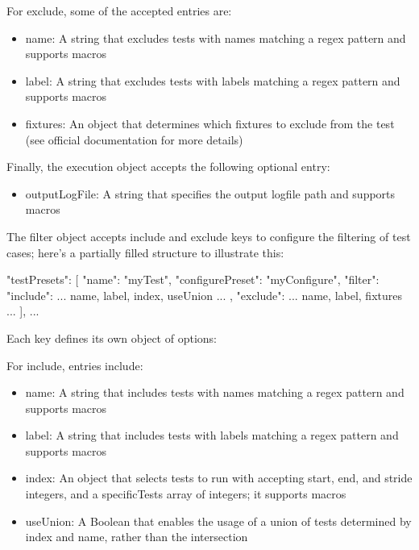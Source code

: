 For exclude, some of the accepted entries are:

\begin{itemize}
\item
name: A string that excludes tests with names matching a regex pattern and supports macros

\item
label: A string that excludes tests with labels matching a regex pattern and supports macros

\item
fixtures: An object that determines which fixtures to exclude from the test (see official documentation for more details)
\end{itemize}

Finally, the execution object accepts the following optional entry:

\begin{itemize}
\item
outputLogFile: A string that specifies the output logfile path and supports macros
\end{itemize}

The filter object accepts include and exclude keys to configure the filtering of test cases; here’s a partially filled structure to illustrate this:

\begin{json}
    "testPresets": [
        {
            "name": "myTest",
            "configurePreset": "myConfigure",
            "filter": {
                "include": {
                    ... name, label, index, useUnion ...
                },
                "exclude": {
                    ... name, label, fixtures ...
                }
            }
        }
    ],
...
\end{json}

Each key defines its own object of options:

For include, entries include:

\begin{itemize}
\item
name: A string that includes tests with names matching a regex pattern and supports macros

\item
label: A string that includes tests with labels matching a regex pattern and supports macros

\item
index: An object that selects tests to run with accepting start, end, and stride integers, and a specificTests array of integers; it supports macros

\item
useUnion: A Boolean that enables the usage of a union of tests determined by index and name, rather than the intersection
\end{itemize}

